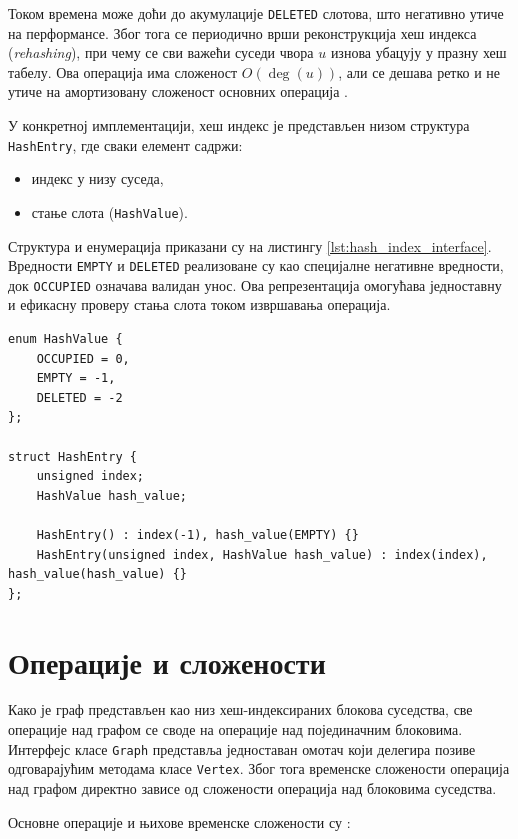 Током времена може доћи до акумулације \texttt{DELETED} слотова, што негативно утиче на перформансе. Због тога се периодично врши реконструкција хеш индекса (\emph{rehashing}), при чему се сви важећи суседи чвора $u$ изнова убацују у празну хеш табелу. Ова операција има сложеност $O(\deg(u))$, али се дешава ретко и не утиче на амортизовану сложеност основних операција \cite{vandergrinten_et_al:LIPIcs.SEA.2022.11}.

У конкретној имплементацији, хеш индекс је представљен низом структура \texttt{HashEntry}, где сваки елемент садржи:
\begin{itemize}
    \item индекс у низу суседа,
    \item стање слота (\texttt{HashValue}).
\end{itemize}

Структура и енумерација приказани су на листингу \ref{lst:hash_index_interface}. Вредности \texttt{EMPTY} и \texttt{DELETED} реализоване су као специјалне негативне вредности, док \texttt{OCCUPIED} означава валидан унос. Ова репрезентација омогућава једноставну и ефикасну проверу стања слота током извршавања операција.

\begin{lstlisting}[style=thesiscpp, caption={Елементи хеш индекса}, label={lst:hash_index_interface}]
enum HashValue {
    OCCUPIED = 0,
    EMPTY = -1,
    DELETED = -2
};

struct HashEntry {
    unsigned index;
    HashValue hash_value;

    HashEntry() : index(-1), hash_value(EMPTY) {}
    HashEntry(unsigned index, HashValue hash_value) : index(index), hash_value(hash_value) {}
};
\end{lstlisting}


\section{Операције и сложености}

Како је граф представљен као низ хеш-индексираних блокова суседства, све операције над графом се своде на операције над појединачним блоковима. Интерфејс класе \texttt{Graph} представља једноставан омотач који делегира позиве одговарајућим методама класе \texttt{Vertex}. Због тога временске сложености операција над графом директно зависе од сложености операција над блоковима суседства.

Основне операције и њихове временске сложености су \cite{vandergrinten_et_al:LIPIcs.SEA.2022.11}:

